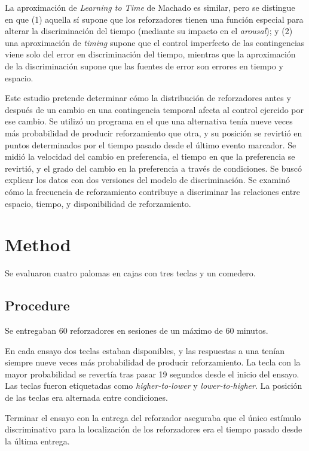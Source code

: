 \documentclass[a4paper,12pt]{article}
\begin{document}
La aproximación de {\itshape Learning to Time} de Machado es similar, pero se distingue en que (1) aquella sí supone que los reforzadores tienen una función especial para alterar la discriminación del tiempo (mediante su impacto en el {\itshape arousal}); y (2) una aproximación de {\itshape timing} supone que el control imperfecto de las contingencias viene solo del error en discriminación del tiempo, mientras que la aproximación de la discriminación supone que las fuentes de error son errores en tiempo y espacio.

Este estudio pretende determinar cómo la distribución de reforzadores antes y después de un cambio en una contingencia temporal afecta al control ejercido por ese cambio. Se utilizó un programa en el que una alternativa tenía nueve veces más probabilidad de producir reforzamiento que otra, y su posición se revirtió en puntos determinados por el tiempo pasado desde el último evento marcador. Se midió la velocidad del cambio en preferencia, el tiempo en que la preferencia se revirtió, y el grado del cambio en la preferencia a través de condiciones. Se buscó explicar los datos con dos versiones del modelo de discriminación. Se examinó cómo la frecuencia de reforzamiento contribuye a discriminar las relaciones entre espacio, tiempo, y disponibilidad de reforzamiento.

\section{Method}

Se evaluaron cuatro palomas en cajas con tres teclas y un comedero.

\subsection{Procedure}

Se entregaban 60 reforzadores en sesiones de un máximo de 60 minutos.

En cada ensayo dos teclas estaban disponibles, y las respuestas a una tenían siempre nueve veces más probabilidad de producir reforzamiento. La tecla con la mayor probabilidad se revertía tras pasar 19 segundos desde el inicio del ensayo. Las teclas fueron etiquetadas como {\itshape higher-to-lower} y {\itshape lower-to-higher}. La posición de las teclas era alternada entre condiciones.

Terminar el ensayo con la entrega del reforzador aseguraba que el único estímulo discriminativo para la localización de los reforzadores era el tiempo pasado desde la última entrega.
\end{document}
